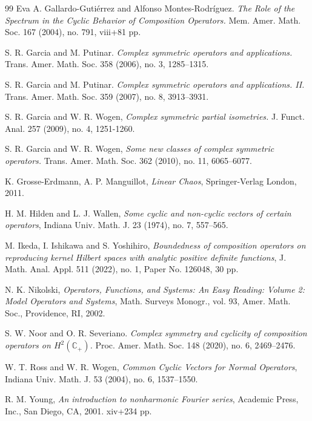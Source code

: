 \documentclass[11pt]{amsart}%
\numberwithin{equation}{section}
\theoremstyle{plain}
\theoremstyle{definition}
\theoremstyle{definition}
\begin{document}
\begin{thebibliography}{99}
     Eva A. Gallardo-Gutiérrez and Alfonso Montes-Rodríguez. \emph{The Role of the Spectrum in the Cyclic Behavior of Composition Operators.} Mem. Amer. Math. Soc. 167 (2004), no. 791, viii+81 pp.                                
		
 S. R. Garcia and M. Putinar. \emph{Complex symmetric operators and applications.} Trans. Amer. Math. Soc. 358 (2006), no. 3, 1285–1315. 
		
 S. R. Garcia and M. Putinar. \emph{Complex symmetric operators and applications. II.} Trans. Amer. Math. Soc. 359 (2007), no. 8, 3913–3931.
		
		
		
S. R. Garcia and W. R. Wogen, \emph{Complex symmetric partial isometries.} J. Funct. Anal. 257 (2009), no. 4, 1251-1260.
	
	
S. R. Garcia and W. R. Wogen, \emph{Some new classes of
complex symmetric operators.} Trans. Amer. Math. Soc. 362 (2010), no. 11, 6065--6077.

 K. Grosse-Erdmann, A. P. Manguillot, {\em  Linear Chaos}, Springer-Verlag London, 2011.

 H. M. Hilden and L. J. Wallen, \emph{Some cyclic and non-cyclic vectors of certain operators}, Indiana Univ. Math. J. 23 (1974), no. 7, 557–565.

 M. Ikeda, I. Ishikawa and S. Yoshihiro, \emph{Boundedness of composition operators on reproducing kernel Hilbert spaces with analytic positive definite functions}, J. Math. Anal. Appl. 511 (2022), no. 1, Paper No. 126048, 30 pp.




        


		

 N. K. Nikolski, \emph{Operators, Functions, and Systems: An Easy Reading: Volume 2: Model Operators and Systems}, Math. Surveys Monogr., vol. 93, Amer. Math. Soc., Providence, RI, 2002.
        
 S. W. Noor and O. R. Severiano. \emph{Complex symmetry and cyclicity of composition operators on $H^2(\mathbb{C}_+)$.} Proc. Amer. Math. Soc. 148 (2020), no. 6, 2469–2476.


        
 W. T. Ross and W. R. Wogen, \emph{Common Cyclic Vectors for Normal Operators}, Indiana Univ. Math. J. 53 (2004), no. 6, 1537–1550.
   

 R. M. Young, \emph{An introduction to nonharmonic Fourier series}, Academic Press, Inc., San Diego, CA, 2001. xiv+234 pp.
		
		
\end{thebibliography}
	
	
	
	
\end{document}
